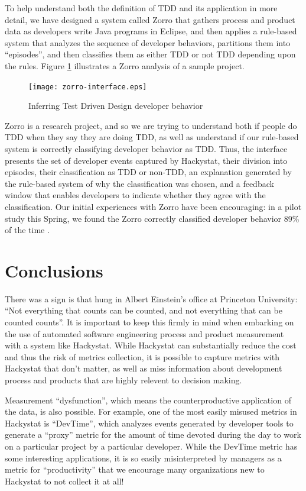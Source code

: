 \documentclass[12pt]{article}
\begin{document}
To help understand both the definition of TDD and its application in more
detail, we have designed a system called Zorro that gathers process and
product data as developers write Java programs in Eclipse, and then applies
a rule-based system that analyzes the sequence of developer behaviors,
partitions them into ``episodes'', and then classifies them as either TDD
or not TDD depending upon the rules.  Figure \ref{fig:tdd} illustrates a Zorro
analysis of a sample project.

\begin{figure}[t]
  \centering
  \texttt{[image: zorro-interface.eps]}
  \caption{Inferring Test Driven Design developer behavior}
  \label{fig:tdd}
\end{figure}

Zorro is a research project, and so we are trying to understand both if
people do TDD when they say they are doing TDD, as well as understand if
our rule-based system is correctly classifying developer behavior as TDD.
Thus, the interface presents the set of developer events captured by
Hackystat, their division into episodes, their classification as TDD or
non-TDD, an explanation generated by the rule-based system of why the
classification was chosen, and a feedback window that enables developers to
indicate whether they agree with the classification.  Our initial
experiences with Zorro have been encouraging: in a pilot study this Spring,
we found the Zorro correctly classified developer behavior 89\% of the time
\cite{csdl2-06-02}.

\section{Conclusions}

There was a sign is that hung in Albert Einstein's office at Princeton
University: ``Not everything that counts can be counted, and not everything
that can be counted counts''.  It is important to keep this firmly in mind
when embarking on the use of automated software engineering process and
product measurement with a system like Hackystat. While Hackystat can
substantially reduce the cost and thus the risk of metrics collection, it
is possible to capture metrics with Hackystat that don't matter, as well as
miss information about development process and products that are highly
relevent to decision making.

Measurement ``dysfunction'', which means the counterproductive application
of the data, is also possible.  For example, one of the most easily misused
metrics in Hackystat is ``DevTime'', which analyzes events generated by
developer tools to generate a ``proxy'' metric for the amount of time
devoted during the day to work on a particular project by a particular
developer. While the DevTime metric has some interesting applications, it
is so easily misinterpreted by managers as a metric for ``productivity''
that we encourage many organizations new to Hackystat to not collect it at
all!
\end{document}
